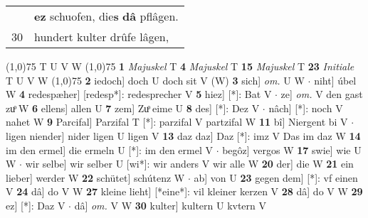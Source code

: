 \documentclass[8pt,a4paper,notitlepage]{article}
\begin{document}
\begin{table}[ht]
\begin{minipage}[t]{0.5\linewidth}
\begin{tabular}{rl}
 & \textbf{ez} schuofen, die\textbf{s} \textbf{dâ} pflâgen.\\ 
30 & hundert kulter drûfe lâgen,\\ 
\end{tabular}
\scriptsize
\line(1,0){75} \newline
T U V W \newline
\line(1,0){75} \newline
\textbf{1} \textit{Majuskel} T  \textbf{4} \textit{Majuskel} T  \textbf{15} \textit{Majuskel} T  \textbf{23} \textit{Initiale} T U V W  \newline
\line(1,0){75} \newline
\textbf{2} iedoch] doch U doch sit V (W) \textbf{3} sich] \textit{om.} U W  $\cdot$ niht] úbel W \textbf{4} redespæher] [redesp*]: redesprecher  V \textbf{5} hiez] [*]: Bat V  $\cdot$ ze] \textit{om.} V den gast zuͦ W \textbf{6} ellens] allen U \textbf{7} zem] Zuͦ eime U \textbf{8} des] [*]: Dez V  $\cdot$ nâch] [*]: noch V nahet W \textbf{9} Parcifal] Parzifal T [*]: parzifal V partzifal W \textbf{11} bî] Niergent bi V  $\cdot$ ligen niender] nider ligen U ligen V \textbf{13} daz daz] Daz [*]: imz V Das im daz W \textbf{14} im den ermel] die ermeln U [*]: im den ermel V  $\cdot$ begôz] vergos W \textbf{17} swie] wie U W  $\cdot$ wir selbe] wir selber U [wi*]: wir anders V wir alle W \textbf{20} der] die W \textbf{21} ein lieber] werder W \textbf{22} schütet] schútenz W  $\cdot$ ab] von U \textbf{23} gegen dem] [*]: vf einen V \textbf{24} dâ] do V W \textbf{27} kleine lieht] [*eine*]: vil kleiner kerzen V \textbf{28} dâ] do V W \textbf{29} ez] [*]: Daz V  $\cdot$ dâ] \textit{om.} V W \textbf{30} kulter] kultern U kvtern V \newline
\end{minipage}
\end{table}
\end{document}
